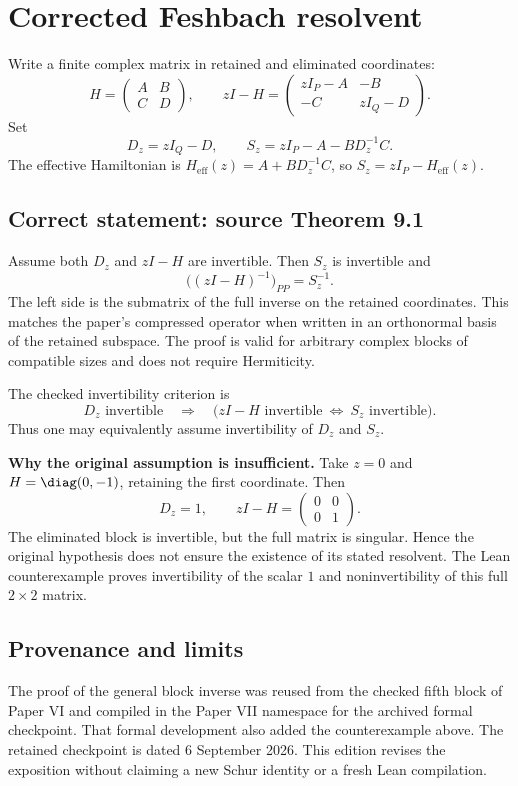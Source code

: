 \section{Corrected Feshbach resolvent}\label{supp1:section:003}
Write a finite complex matrix in retained and eliminated coordinates:
\[
H=\begin{pmatrix}A&B\\C&D\end{pmatrix},\qquad
zI-H=\begin{pmatrix}zI_P-A&-B\\-C&zI_Q-D\end{pmatrix}.
\]
Set
\[
D_z=zI_Q-D,\qquad S_z=zI_P-A-BD_z^{-1}C.
\]
The effective Hamiltonian is $H_{\mathrm{eff}}(z)=A+BD_z^{-1}C$, so
$S_z=zI_P-H_{\mathrm{eff}}(z)$.

\subsection{Correct statement: source Theorem 9.1}
Assume both $D_z$ and $zI-H$ are invertible. Then $S_z$ is invertible and
\[
\boxed{\bigl((zI-H)^{-1}\bigr)_{PP}=S_z^{-1}.}
\]
The left side is the submatrix of the full inverse on the retained coordinates. This matches the paper's compressed operator when written in an orthonormal basis of the retained subspace. The proof is valid for arbitrary complex blocks of compatible sizes and does not require Hermiticity.

The checked invertibility criterion is
\[
D_z\text{ invertible}\quad\Longrightarrow\quad
\bigl(zI-H\text{ invertible}\ \Longleftrightarrow\ S_z\text{ invertible}\bigr).
\]
Thus one may equivalently assume invertibility of $D_z$ and $S_z$.

\textbf{Why the original assumption is insufficient.}
Take $z=0$ and $H=\diag(0,-1)$, retaining the first coordinate. Then
\[
D_z=1,\qquad zI-H=\begin{pmatrix}0&0\\0&1\end{pmatrix}.
\]
The eliminated block is invertible, but the full matrix is singular. Hence the original hypothesis does not ensure the existence of its stated resolvent. The Lean counterexample proves invertibility of the scalar $1$ and noninvertibility of this full $2\times2$ matrix.



\subsection{Provenance and limits}
The proof of the general block inverse was reused from the checked fifth block of Paper VI and compiled in the Paper VII namespace for the archived formal checkpoint. That formal development also added the counterexample above. The retained checkpoint is dated 6 September 2026. This edition revises the exposition without claiming a new Schur identity or a fresh Lean compilation.

